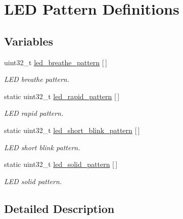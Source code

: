 \hypertarget{group___s_d___l_e_d___pattern___definitions}{}\section{L\+ED Pattern Definitions}
\label{group___s_d___l_e_d___pattern___definitions}
\subsection*{Variables}
\begin{DoxyCompactItemize}
\item 
\mbox{\label{group___s_d___l_e_d___pattern___definitions_ga06b8eed3a2c65238cc510e61d75e8fde}} 
uint32\+\_\+t \mbox{\hyperlink{group___s_d___l_e_d___pattern___definitions_ga06b8eed3a2c65238cc510e61d75e8fde}{led\+\_\+breathe\+\_\+pattern}} \mbox{[}$\,$\mbox{]}
\begin{DoxyCompactList}\small\item\em L\+ED breathe pattern. \end{DoxyCompactList}\item 
static uint32\+\_\+t \mbox{\hyperlink{group___s_d___l_e_d___pattern___definitions_gaaf958cbda7044776ff2c95480a8a7255}{led\+\_\+rapid\+\_\+pattern}} \mbox{[}$\,$\mbox{]}
\begin{DoxyCompactList}\small\item\em L\+ED rapid pattern. \end{DoxyCompactList}\item 
static uint32\+\_\+t \mbox{\hyperlink{group___s_d___l_e_d___pattern___definitions_gab00146182d393d8d60879aa35205ffe2}{led\+\_\+short\+\_\+blink\+\_\+pattern}} \mbox{[}$\,$\mbox{]}
\begin{DoxyCompactList}\small\item\em L\+ED short blink pattern. \end{DoxyCompactList}\item 
static uint32\+\_\+t \mbox{\hyperlink{group___s_d___l_e_d___pattern___definitions_ga9220a191a8d408610b6c32eb3ccdc11e}{led\+\_\+solid\+\_\+pattern}} \mbox{[}$\,$\mbox{]}
\begin{DoxyCompactList}\small\item\em L\+ED solid pattern. \end{DoxyCompactList}\end{DoxyCompactItemize}


\subsection{Detailed Description}


